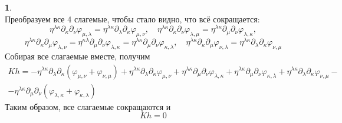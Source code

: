 \documentclass[12pt]{article}
\theoremstyle{definition}
\newtheorem{zad}{}[section]
\begin{document}
\begin{zad}
\begin{equation}
\end{equation}
Преобразуем все 4 слагемые, чтобы стало видно, что всё сокращается:
\begin{equation}
    \eta^{\lambda\kappa}\partial_\kappa\partial_\nu\varphi_{\mu,\lambda}=\eta^{\lambda\kappa}\partial_\lambda\partial_\kappa\varphi_{\mu,\nu},\quad \eta^{\lambda\kappa}\partial_\kappa\partial_\nu\varphi_{\lambda,\mu}=\eta^{\lambda\kappa}\partial_\mu\partial_\nu\varphi_{\lambda,\kappa},
\end{equation}
\begin{equation}
     \eta^{\lambda\kappa}\partial_\kappa\partial_\mu\varphi_{\lambda,\nu}=\eta^{\kappa\lambda}\partial_\mu\partial_\nu\varphi_{\lambda,\kappa}=\eta^{\lambda\kappa}\partial_\mu\partial_\nu\varphi_{\kappa,\lambda},\quad \eta^{\lambda\kappa}\partial_\kappa\partial_\mu\varphi_{\nu,\lambda}=\eta^{\lambda\kappa}\partial_\lambda\partial_\kappa\varphi_{\nu,\mu}
\end{equation}
Собирая все слагаемые вместе, получим
\begin{multline}
    Kh=-\eta^{\lambda\kappa}\partial_\lambda\partial_\kappa(\varphi_{\mu,\nu} + \varphi_{\nu,\mu}) + \eta^{\lambda\kappa}\partial_\lambda\partial_\kappa\varphi_{\mu,\nu} + \eta^{\lambda\kappa}\partial_\mu\partial_\nu\varphi_{\lambda,\kappa}+\eta^{\lambda\kappa}\partial_\mu\partial_\nu\varphi_{\kappa,\lambda}+\eta^{\lambda\kappa}\partial_\lambda\partial_\kappa\varphi_{\nu,\mu}-\\-\eta^{\lambda\kappa}\partial_\mu\partial_\nu(\varphi_{\lambda,\kappa} + \varphi_{\kappa,\lambda})
\end{multline}
Таким образом, все слагаемые сокращаются и
\begin{equation}
    \boxed{Kh=0}
\end{equation}
\end{zad}
\end{document}

